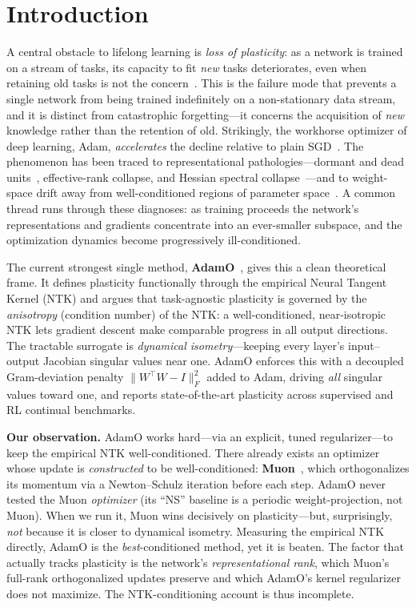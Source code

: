 \documentclass[letterpaper]{article} %
\begin{document}
\section{Introduction}
A central obstacle to lifelong learning is \emph{loss of plasticity}: as a network is trained on a stream of tasks, its capacity to fit \emph{new} tasks deteriorates, even when retaining old tasks is not the concern~\citep{dohare2024}. This is the failure mode that prevents a single network from being trained indefinitely on a non-stationary data stream, and it is distinct from catastrophic forgetting---it concerns the acquisition of \emph{new} knowledge rather than the retention of old. Strikingly, the workhorse optimizer of deep learning, Adam, \emph{accelerates} the decline relative to plain SGD~\citep{dohare2024}. The phenomenon has been traced to representational pathologies---dormant and dead units~\citep{sokar2023}, effective-rank collapse, and Hessian spectral collapse~\citep{spectralcollapse2025}---and to weight-space drift away from well-conditioned regions of parameter space~\citep{kumar2023}. A common thread runs through these diagnoses: as training proceeds the network's representations and gradients concentrate into an ever-smaller subspace, and the optimization dynamics become progressively ill-conditioned.

The current strongest single method, \textbf{AdamO}~\citep{adamo2026}, gives this a clean theoretical frame. It defines plasticity functionally through the empirical Neural Tangent Kernel (NTK) and argues that task-agnostic plasticity is governed by the \emph{anisotropy} (condition number) of the NTK: a well-conditioned, near-isotropic NTK lets gradient descent make comparable progress in all output directions. The tractable surrogate is \emph{dynamical isometry}---keeping every layer's input--output Jacobian singular values near one. AdamO enforces this with a decoupled Gram-deviation penalty $\|W^\top W - I\|_F^2$ added to Adam, driving \emph{all} singular values toward one, and reports state-of-the-art plasticity across supervised and RL continual benchmarks.

\textbf{Our observation.} AdamO works hard---via an explicit, tuned regularizer---to keep the empirical NTK well-conditioned. There already exists an optimizer whose update is \emph{constructed} to be well-conditioned: \textbf{Muon}~\citep{muon2024}, which orthogonalizes its momentum via a Newton--Schulz iteration before each step. AdamO never tested the Muon \emph{optimizer} (its ``NS'' baseline is a periodic weight-projection, not Muon). When we run it, Muon wins decisively on plasticity---but, surprisingly, \emph{not} because it is closer to dynamical isometry. Measuring the empirical NTK directly, AdamO is the \emph{best}-conditioned method, yet it is beaten. The factor that actually tracks plasticity is the network's \emph{representational rank}, which Muon's full-rank orthogonalized updates preserve and which AdamO's kernel regularizer does not maximize. The NTK-conditioning account is thus incomplete.
\end{document}
